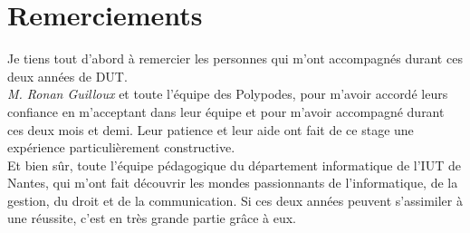 \section*{Remerciements}

Je tiens tout d'abord à remercier les personnes qui m'ont accompagnés durant ces deux années de DUT.\\

\textit{M. Ronan Guilloux} et toute l'équipe des Polypodes, pour m'avoir accordé leurs confiance en m'acceptant dans leur équipe et pour m'avoir accompagné durant ces deux mois et demi. Leur patience et leur aide ont fait de ce stage une expérience particulièrement constructive.\\

Et bien sûr, toute l'équipe pédagogique du département informatique de l'IUT de Nantes, qui m'ont fait découvrir les mondes passionnants de l'informatique, de la gestion, du droit et de la communication. Si ces deux années peuvent s'assimiler à une réussite, c'est en très grande partie grâce à eux.\\

